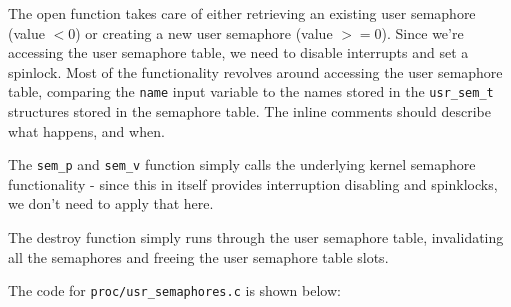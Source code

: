 \documentclass[a4paper,12pt]{article}
\begin{document}
The open function takes care of either retrieving an existing user semaphore (value $< 0$) or creating a new user semaphore (value $>= 0$). Since we're accessing the user semaphore table, we need to disable interrupts and set a spinlock. Most of the functionality revolves around accessing the user semaphore table, comparing the \texttt{name} input variable to the names stored in the \texttt{usr\_sem\_t} structures stored in the semaphore table. The inline comments should describe what happens, and when.

The \texttt{sem\_p} and \texttt{sem\_v} function simply calls the underlying kernel semaphore functionality - since this in itself provides interruption disabling and spinklocks, we don't need to apply that here.

The destroy function simply runs through the user semaphore table, invalidating all the semaphores and freeing the user semaphore table slots.

The code for \texttt{proc/usr\_semaphores.c} is shown below:


\end{document}
